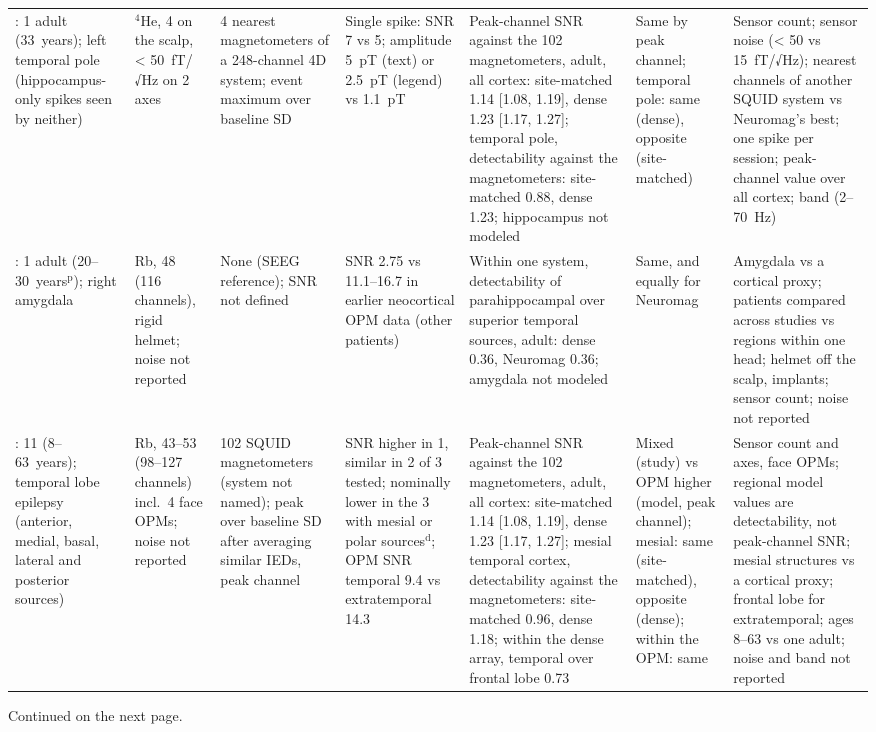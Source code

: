 \documentclass[preprint,12pt,authoryear,a4paper]{elsarticle}
\begin{document}
\begin{table}
\begin{tabular}{L{2.7cm}L{2.1cm}L{2.9cm}L{3.3cm}L{5.7cm}L{2.2cm}L{4.1cm}}
\citet{badier2023}: 1 adult (33~years); left temporal pole (hippocampus-only spikes seen by neither) & $^{4}$He, 4 on the scalp, < 50~fT/√Hz on 2 axes & 4 nearest magnetometers of a 248-channel 4D system; event maximum over baseline SD & Single spike: SNR 7 vs 5; amplitude 5~pT (text) or 2.5~pT (legend) vs 1.1~pT & Peak-channel SNR against the 102 magnetometers, adult, all cortex: site-matched 1.14 [1.08, 1.19], dense 1.23 [1.17, 1.27]; temporal pole, detectability against the magnetometers: site-matched 0.88, dense 1.23; hippocampus not modeled & Same by peak channel; temporal pole: same (dense), opposite (site-matched) & Sensor count; sensor noise (< 50 vs 15~fT/√Hz); nearest channels of another SQUID system vs Neuromag's best; one spike per session; peak-channel value over all cortex; band (2--70~Hz) \\
\citet{feys2024}: 1 adult (20--30~years$^{\mathrm{p}}$); right amygdala & Rb, 48 (116 channels), rigid helmet; noise not reported & None (SEEG reference); SNR not defined & SNR 2.75 vs 11.1--16.7 in earlier neocortical OPM data (other patients) & Within one system, detectability of parahippocampal over superior temporal sources, adult: dense 0.36, Neuromag 0.36; amygdala not modeled & Same, and equally for Neuromag & Amygdala vs a cortical proxy; patients compared across studies vs regions within one head; helmet off the scalp, implants; sensor count; noise not reported \\
\citet{feys2025}: 11 (8--63~years); temporal lobe epilepsy (anterior, medial, basal, lateral and posterior sources) & Rb, 43--53 (98--127 channels) incl.\ 4 face OPMs; noise not reported & 102 SQUID magnetometers (system not named); peak over baseline SD after averaging similar IEDs, peak channel & SNR higher in 1, similar in 2 of 3 tested; nominally lower in the 3 with mesial or polar sources$^{\mathrm{d}}$; OPM SNR temporal 9.4 vs extratemporal 14.3 & Peak-channel SNR against the 102 magnetometers, adult, all cortex: site-matched 1.14 [1.08, 1.19], dense 1.23 [1.17, 1.27]; mesial temporal cortex, detectability against the magnetometers: site-matched 0.96, dense 1.18; within the dense array, temporal over frontal lobe 0.73 & Mixed (study) vs OPM higher (model, peak channel); mesial: same (site-matched), opposite (dense); within the OPM: same & Sensor count and axes, face OPMs; regional model values are detectability, not peak-channel SNR; mesial structures vs a cortical proxy; frontal lobe for extratemporal; ages 8--63 vs one adult; noise and band not reported \\
\bottomrule
\end{tabular}
\par\smallskip
{\footnotesize\raggedleft Continued on the next page.\par}
\end{table}
\end{document}
